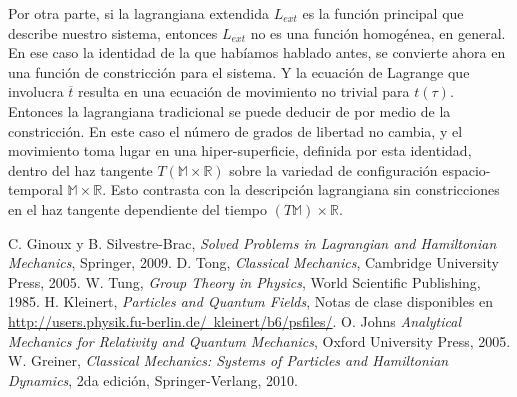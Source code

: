 \documentclass[a4paper,10pt]{article}
\numberwithin{equation}{section}
\begin{document}
Por otra parte, si la lagrangiana extendida $L_{ext}$ es la función principal que 
describe nuestro sistema, entonces $L_{ext}$ no es una función homogénea, en general. 
En ese caso la identidad de la que habíamos hablado antes, se convierte ahora en una 
función de constricción para el sistema. Y la ecuación de Lagrange que involucra 
$\overline{t}$ resulta en una ecuación de movimiento no trivial para $t(\tau)$. Entonces 
la lagrangiana tradicional se puede deducir de  por medio 
de la constricción. En este caso el número de grados de libertad no cambia, y el movimiento 
toma lugar en una hiper-superficie, definida por esta identidad, dentro del haz 
tangente $T(\mathbb{M}\times\mathbb{R})$ sobre la variedad de configuración espacio-temporal 
$\mathbb{M}\times\mathbb{R}$. Esto contrasta con la descripción lagrangiana sin 
constricciones en el haz tangente dependiente del tiempo $(T\mathbb{M})\times \mathbb{R}$.


\begin{thebibliography}{20}
C. Ginoux y B. Silvestre-Brac, \emph{Solved Problems in Lagrangian and Hamiltonian Mechanics},
Springer, 2009.
D. Tong, \emph{Classical Mechanics}, Cambridge University Press, 2005.
W. Tung, \emph{Group Theory in Physics}, World Scientific Publishing, 1985.
H. Kleinert, \emph{Particles and Quantum Fields}, Notas de clase 
disponibles en \href{http://users.physik.fu-berlin.de/~kleinert/b6/psfiles/}{http://users.physik.fu-berlin.de/~kleinert/b6/psfiles/}.
O. Johns \emph{Analytical Mechanics for Relativity and Quantum Mechanics}, Oxford 
University Press, 2005.
W. Greiner, \emph{Classical Mechanics: Systems of Particles and Hamiltonian Dynamics},
2da edición, Springer-Verlang, 2010.
\end{thebibliography}
\end{document}
